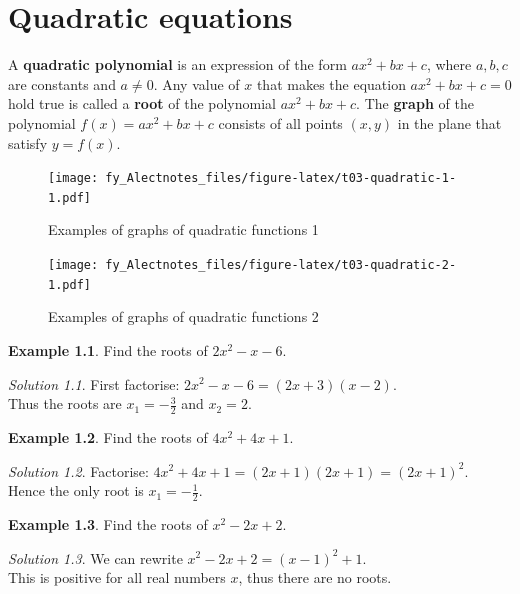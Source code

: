 \documentclass[
  12pt,
  oneside]{book}
\theoremstyle{definition}
\theoremstyle{definition}
\newtheorem{example}{Example}[chapter]
\theoremstyle{definition}
\theoremstyle{definition}
\theoremstyle{remark}
\newtheorem*{solution}{Solution}
\begin{document}
\chapter{Quadratic equations}\label{quadratic-equations}

A \textbf{quadratic polynomial} is an expression of the form \(ax^2+bx+c\), where \(a,b,c\) are constants and \(a\neq0\).
Any value of \(x\) that makes the equation \(ax^2+bx+c=0\) hold true is called a \textbf{root} of the polynomial \(ax^2+bx+c\). The \textbf{graph} of the polynomial \(f(x)=ax^2+bx+c\) consists of all points \((x,y)\) in the plane that satisfy \(y=f(x)\).

\begin{figure}
\centering
\texttt{[image: fy\_Alectnotes\_files/figure-latex/t03-quadratic-1-1.pdf]}
\caption{\label{fig:t03-quadratic-1}Examples of graphs of quadratic functions 1}
\end{figure}

\begin{figure}
\centering
\texttt{[image: fy\_Alectnotes\_files/figure-latex/t03-quadratic-2-1.pdf]}
\caption{\label{fig:t03-quadratic-2}Examples of graphs of quadratic functions 2}
\end{figure}

\begin{example}
Find the roots of \(2x^2-x-6\).
\end{example}

\begin{solution}
First factorise: \(2x^2-x-6 = (2x+3)(x-2)\).\\
Thus the roots are \(x_1=-\frac{3}{2}\) and \(x_2=2\).
\end{solution}

\begin{example}
Find the roots of \(4x^2+4x+1\).
\end{example}

\begin{solution}
Factorise: \(4x^2+4x+1=(2x+1)(2x+1)=(2x+1)^2\).\\
Hence the only root is \(x_1=-\frac{1}{2}\).
\end{solution}

\begin{example}
Find the roots of \(x^2-2x+2\).
\end{example}

\begin{solution}
We can rewrite \(x^2-2x+2=(x-1)^2+1\).\\
This is positive for all real numbers \(x\), thus there are no roots.
\end{solution}
\end{document}
